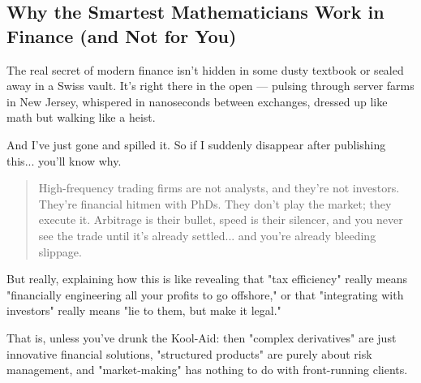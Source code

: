 \subsection{Why the Smartest Mathematicians Work in Finance (and Not for You)}

The real secret of modern finance isn’t hidden in some dusty textbook or sealed away in a Swiss vault. It’s right there in the open — pulsing through server farms in New Jersey, whispered in nanoseconds between exchanges, dressed up like math but walking like a heist.

And I’ve just gone and spilled it.  So if I suddenly disappear after publishing this... you'll know why. 

\begin{quote}
High-frequency trading firms are not analysts, and they’re not investors. They’re financial hitmen with PhDs. They don’t play the market; they execute it. Arbitrage is their bullet, speed is their silencer, and you never see the trade until it’s already settled... and you’re already bleeding slippage.
\end{quote}

But really, explaining how this is like revealing that "tax efficiency" really means "financially engineering all your profits to go offshore," or that "integrating with investors" really means "lie to them, but make it legal."

That is, unless you’ve drunk the Kool-Aid: then "complex derivatives" are just innovative financial solutions, "structured products" are purely about risk management, and "market-making" has nothing to do with front-running clients.

